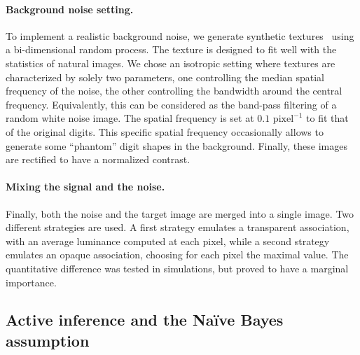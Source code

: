 \paragraph{Background noise setting.} To implement a realistic background noise, we generate synthetic textures~\cite{Sanz12} using a bi-dimensional random process. %
The texture is designed to fit well with the statistics of natural images. We chose an isotropic setting where textures are characterized by solely two parameters, one controlling the median spatial frequency of the noise, the other controlling the bandwidth around the central frequency. Equivalently, this can be considered as the band-pass filtering of a random white noise image. The spatial frequency is set at $0.1\text{ pixel}^{-1}$ to fit that of the original digits. This specific spatial frequency occasionally allows to generate some ``phantom'' digit shapes in the background. Finally, these images are rectified to have a normalized contrast.

\paragraph{Mixing the signal and the noise.} Finally, both the noise and the target image are merged into a single image. Two different strategies are used. A first strategy emulates a transparent association, with an average luminance computed at each pixel, while a second strategy emulates an opaque association, choosing for each pixel the maximal value. The quantitative difference was tested in simulations, but proved to have a marginal importance.

\subsection{Active inference and the Naïve Bayes assumption}


